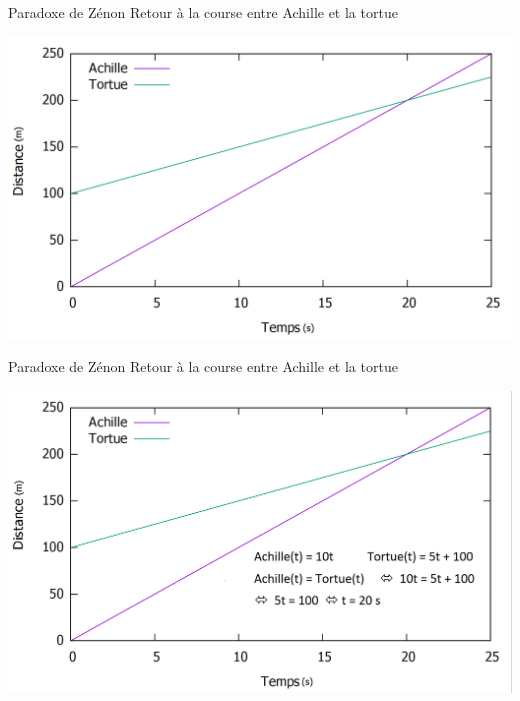 \documentclass[usenames, dvipsnames, no-framenumber]{beamer}
\begin{document}
\begin{frame}%
{Paradoxe de Zénon}
Retour à la course entre Achille et la tortue 
\pause
\begin{center}
\includegraphics[scale=0.35]{images/ZAPT2.png}
\end{center}
\end{frame}



\begin{frame}%
{Paradoxe de Zénon}
Retour à la course entre Achille et la tortue
\begin{center}
\includegraphics[scale=0.35]{images/ZAPT3.png}
\end{center}
\end{frame}
\end{document}
